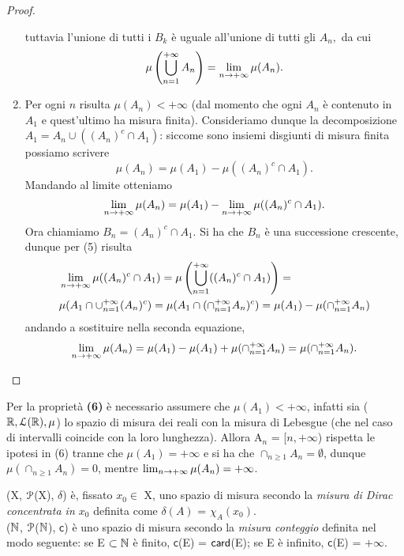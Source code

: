 \documentclass[Completo.tex]{subfiles}
\begin{document}
\begin{proof}
\begin{enumerate}
		tuttavia l'unione di tutti i $B_k$ è uguale all'unione di tutti gli $A_n,$ da cui
		\begin{equation*}
		\mu\left(\bigcup_{n =1}^{+\infty} A_n\right) = \lim_{n \rightarrow +\infty} \mu(A_n).
		\end{equation*}
		\item Per ogni $n$ risulta $\mu(A_n) < +\infty$ (dal momento che ogni $A_n$ è contenuto in $A_1$ e quest'ultimo ha misura finita). Consideriamo dunque la decomposizione $A_1 = A_n \cup ((A_n)^{c}\cap A_1)$: siccome sono insiemi disgiunti di misura finita possiamo scrivere
		\begin{equation*}
		\mu(A_n) = \mu(A_1) - \mu((A_n)^{c}\cap A_1).
		\end{equation*}
		Mandando al limite otteniamo
		\begin{equation*}
		\lim_{n \rightarrow +\infty} \mu(A_n) = \mu(A_1) - \lim_{n \rightarrow +\infty} \mu((A_n)^{c}\cap A_1).
		\end{equation*}
		Ora chiamiamo $B_n = (A_n)^{c} \cap A_1$. Si ha che $B_n$ è una successione crescente, dunque per (5) risulta
		\begin{align*}
		& \lim_{n \rightarrow +\infty} \mu((A_n)^{c}\cap A_1) = \mu\left( \bigcup_{n =1}^{+\infty} ((A_n)^{c} \cap A_1)\right) = \\
		& \mu(A_1 \cap \cup_{n=1}^{+\infty}(A_n)^{c}) = \mu(A_1 \cap (\cap_{n=1}^{+\infty} A_n)^{c}) = \mu(A_1) - \mu(\cap_{n=1}^{+\infty} A_n)
		\end{align*}
		andando a sostituire nella seconda equazione,
		\begin{equation*}
		\lim_{n \rightarrow +\infty} \mu(A_n) = \mu(A_1) - \mu(A_1) + \mu(\cap_{n=1}^{+\infty} A_n) = \mu(\cap_{n=1}^{+\infty} A_n).
		\end{equation*}
	\end{enumerate}
\end{proof}
\begin{Oss}
	Per la proprietà \textbf{(6)} è necessario assumere che $\mu(A_1) < +\infty$, infatti sia ($\bb[R], \eu[L](\bb[R]), \mu$) lo spazio di misura dei reali con la misura di Lebesgue (che nel caso di intervalli coincide con la loro lunghezza). Allora A$_n$ = [$n, +\infty$) rispetta le ipotesi in (6) tranne che $\mu(A_1) = +\infty$ e si ha che $\cap_{n\geq1}A_n = \emptyset$, dunque $\mu(\cap_{n\geq1}A_n) = 0$, mentre $\lim_{n \rightarrow +\infty} \mu(A_n) = +\infty$.
\end{Oss}
\begin{Ex}
	(X, $\eu[P]$(X), $\delta$) è, fissato $x_0 \in$ X, uno spazio di misura secondo la \textit{misura di Dirac concentrata in $x_0$} definita come $\delta(A)$ = $\chi_A(x_0)$. \\
	($\bb[N]$, $\eu[P]$($\bb[N]$), $\mathsf{c}$) è uno spazio di misura secondo la \textit{misura conteggio} definita nel modo seguente: se E $\sset \bb[N]$ è finito, $\mathsf{c}$(E) = $\sf[card]$(E); se E è infinito, $\mathsf{c}$(E) = $+\infty$.
\end{Ex}
\end{document}
